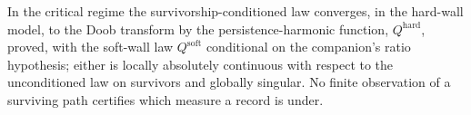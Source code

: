 
\begin{theorem}\label{imp:ceiling}
In the critical regime the survivorship-conditioned law converges, in the
hard-wall model, to the Doob transform by the persistence-harmonic
function, $Q^{\mathrm{hard}}$, proved, with the soft-wall law
$Q^{\mathrm{soft}}$ conditional on the companion's ratio hypothesis;
either is locally absolutely continuous with respect to the
unconditioned law on survivors and globally singular. No finite observation of a surviving path certifies
which measure a record is under.
\end{theorem}

